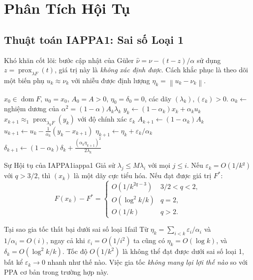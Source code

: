 \documentclass[12pt, a4paper]{article}
\newcommand{\prox}{\operatorname{prox}}
\newcommand{\dom}{\operatorname{dom}}
\newcommand{\norm}[1]{\left\|#1\right\|}
\begin{document}
\section{Phân Tích Hội Tụ}

\subsection{Thuật toán IAPPA1: Sai số Loại 1}

Khó khăn cốt lõi: bước cập nhật của G\"{u}ler
$\hat\nu=\nu-(t-z)/\alpha$ sử dụng $z=\prox_{\lambda F}(t)$,
giá trị này là \emph{không xác định được}.
Cách khắc phục là theo dõi một biến phụ $u_k\approx\nu_k$ với
nhiễu được định lượng $\eta_k=\norm{u_k-\nu_k}$.

\begin{algorithm}[H]
\caption{IAPPA1 --- Thuật toán PPA Gia tốc Không chính xác với Sai số Loại 1}
\label{alg:iappa1}
\begin{algorithmic}[1]
\Require $x_0\in\dom F$, $u_0=x_0$, $A_0=A>0$,
         $\eta_0=\delta_0=0$, các dãy $(\lambda_k),(\varepsilon_k)>0$.
  \State $\alpha_k\leftarrow$ nghiệm dương của $\alpha^2=(1-\alpha)A_k\lambda_k$
  \State $y_k\leftarrow(1-\alpha_k)x_k+\alpha_k u_k$
  \State $x_{k+1}\approx_1\prox_{\lambda_k F}(y_k)$
         với độ chính xác $\varepsilon_k$
  \State $A_{k+1}\leftarrow(1-\alpha_k)A_k$
  \State $u_{k+1}\leftarrow u_k-\tfrac{1}{\alpha_k}(y_k-x_{k+1})$
  \State $\eta_{k+1}\leftarrow\eta_k+\varepsilon_k/\alpha_k$
  \State $\delta_{k+1}\leftarrow(1-\alpha_k)\delta_k
         +\tfrac{(\alpha_k\eta_{k+1})^2}{2\lambda_k}$
\EndFor
\end{algorithmic}
\end{algorithm}

\begin{theorem}{Sự Hội tụ của IAPPA1}{iappa1}
Giả sử $\lambda_j\le M\lambda_i$ với mọi $j\le i$.
Nếu $\varepsilon_k=O(1/k^q)$ với $q>3/2$, thì $(x_k)$ là một dãy cực tiểu hóa.
Nếu đạt được giá trị $F^*$:
\[
  F(x_k)-F^* =
  \begin{cases}
    O(1/k^{2q-3}) & 3/2<q<2,\\
    O(\log^2\!k/k) & q=2,\\
    O(1/k)         & q>2.
  \end{cases}
\]
\end{theorem}

\begin{remark}{Tại sao gia tốc thất bại dưới sai số loại 1}{fail}
Từ $\eta_k=\sum_{i<k}\varepsilon_i/\alpha_i$ và $1/\alpha_i=O(i)$,
ngay cả khi $\varepsilon_i=O(1/i^2)$ ta cũng có $\eta_k=O(\log k)$,
và $\delta_k=O(\log^2\!k/k)$.
Tốc độ $O(1/k^2)$ là không thể đạt được dưới sai số loại 1,
bất kể $\varepsilon_k\to 0$ nhanh như thế nào.
Việc gia tốc \emph{không mang lại lợi thế nào} so với PPA cơ bản trong trường hợp này.
\end{remark}
\end{document}
